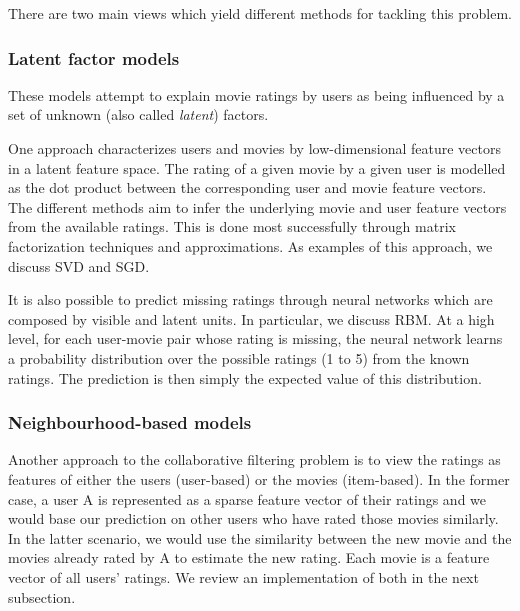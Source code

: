 \documentclass[10pt,conference,compsocconf]{IEEEtran}
\begin{document}
	There are two main views which yield different methods for tackling this problem.
	
	\subsubsection*{\textbf{Latent factor models}} 
	
	
	These models attempt to explain movie ratings by users as being influenced by a set of unknown (also called \emph{latent}) factors.
	
	One approach characterizes users and movies by low-dimensional feature vectors in a latent feature space. The rating of a given movie by a given user is modelled as the dot product between the corresponding user and movie feature vectors. The different methods aim to infer the underlying movie and user feature vectors from the available ratings. This is done most successfully through matrix factorization techniques and approximations. As examples of this approach, we discuss SVD and SGD.
	
	It is also possible to predict missing ratings through neural networks which are composed by visible and latent units. In particular, we discuss RBM. At a high level, for each user-movie pair whose rating is missing, the neural network learns a probability distribution over the possible ratings (1 to 5) from the known ratings. The prediction is then simply the expected value of this distribution.
	
	
	\subsubsection*{\textbf{Neighbourhood-based models}} Another approach to the collaborative filtering problem is to view the ratings as features of either the users (user-based) or the movies (item-based). In the former case, a user A is represented as a sparse feature vector of their ratings and we would base our prediction on other users who have rated those movies similarly. In the latter scenario, we would use the similarity between the new movie and the movies already rated by A to estimate the new rating. Each movie is a feature vector of all users' ratings. We review an implementation of both in the next subsection.
	
\end{document}
